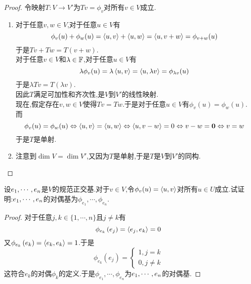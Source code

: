 \documentclass{ctexart}
\begin{document}
\begin{proof}
    令映射$T:V\to V'$为$Tv=\phi_v$对所有$v\in V$成立.
    \begin{enumerate}[label=\tbf{(\arabic*)}]
        \item 对于任意$v,w\in V$,对于任意$u\in V$有
            \[\phi_v(u)+\phi_w(u)=\left\langle{u},{v}\right\rangle+\left\langle{u},{w}\right\rangle=\left\langle{u},{v+w}\right\rangle=\phi_{v+w}(u)\]
            于是$Tv+Tw=T(v+w)$.\\
            对于任意$v\in V$和$\lambda\in\mathbb{F}$,对于任意$u\in V$有
            \[\lambda\phi_v(u)=\lambda\left\langle{u},{v}\right\rangle=\left\langle{u},{\lambda v}\right\rangle=\phi_{\lambda v}(u)\]
            于是$\lambda Tv=T\left(\lambda v\right)$.\\
            因此$T$满足可加性和齐次性,是$V$到$V'$的线性映射.\\
            现在,假定存在$v,w\in V$使得$Tv=Tw$.于是对于任意$u\in V$有$\phi_v(u)=\phi_w(u)$.而
            \[\phi_v(u)=\phi_w(u)\Leftrightarrow \left\langle{u},{v}\right\rangle=\left\langle{u},{w}\right\rangle\Leftrightarrow \left\langle{u},{v-w}\right\rangle=0\Leftrightarrow v-w=\mathbf0\Leftrightarrow v=w\]
            于是$T$是单射.
        \item 注意到$\dim V=\dim V'$,又因为$T$是单射,于是$T$是$V$到$V'$的同构.
    \end{enumerate}
\end{proof}
\begin{problem}[14.]
    设${e}_1,\cdots,{e}_{n}$是$V$的规范正交基.对于$v\in V$,令$\phi_v(u)=\left\langle{u},{v}\right\rangle$对所有$u\in U$成立.试证明:${e}_1,\cdots,{e}_{n}$的对偶基为$\phi_{e_1},\cdots,\phi_{e_n}$.
\end{problem}
\begin{proof}
    对于任意$j,k\in\{1,\cdots,n\}$且$j\neq k$有
    \[\phi_{e_k}\left(e_j\right)=\left\langle{e_j},{e_k}\right\rangle=0\]
    又$\phi_{e_k}\left(e_k\right)=\left\langle{e_k},{e_k}\right\rangle=1$.于是
    \[\phi_{e_k}\left(e_j\right)=\left\{\begin{array}{l}
        1,j=k\\0,j\neq k
    \end{array}\right.\]
    这符合$e_k$的对偶$\phi_k$的定义.于是$\phi_{e_1},\cdots,\phi_{e_n}$为${e}_1,\cdots,{e}_{n}$的对偶基.
\end{proof}
\end{document}
